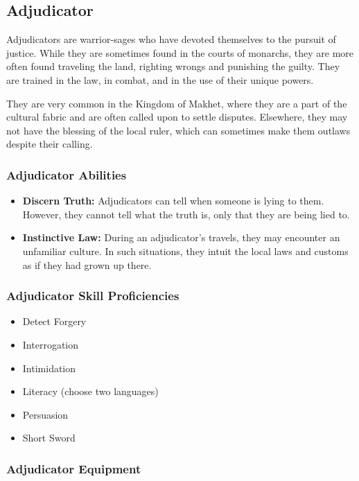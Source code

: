 \begin{multicols}{2}
\subsection{Adjudicator}

Adjudicators are warrior-sages who have devoted themselves to the
pursuit of justice. While they are sometimes found in the courts
of monarchs, they are more often found traveling the land, righting
wrongs and punishing the guilty. They are trained in the law, in
combat, and in the use of their unique powers.

They are very common in the Kingdom of Makhet, where they are a part
of the cultural fabric and are often called upon to settle disputes.
Elsewhere, they may not have the blessing of the local ruler, which
can sometimes make them outlaws despite their calling.

\subsubsection{Adjudicator Abilities}

\begin{itemize}
  \item \textbf{Discern Truth:} Adjudicators can tell when someone is lying
    to them. However, they cannot tell what the truth is, only that they
    are being lied to.
  \item \textbf{Instinctive Law:} During an adjudicator's travels, they
    may encounter an unfamiliar culture. In such situations, they intuit
    the local laws and customs as if they had grown up there.
\end{itemize}

\subsubsection{Adjudicator Skill Proficiencies}

\begin{itemize}
  \item Detect Forgery
  \item Interrogation
  \item Intimidation
  \item Literacy (choose two languages)
  \item Persuasion
  \item Short Sword
\end{itemize}

\subsubsection{Adjudicator Equipment}


\end{multicols}
